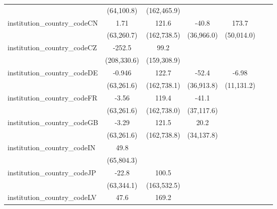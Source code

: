 \begin{tabular}{lcccccc}
                                         & (64,100.8)   & (162,465.9)   &             &               &                &   \\   
   institution\_country\_codeCN          & 1.71         & 121.6         & -40.8       & 173.7         &                &   \\   
                                         & (63,260.7)   & (162,738.5)   & (36,966.0)  & (50,014.0)    &                &   \\   
   institution\_country\_codeCZ          & -252.5       & 99.2          &             &               &                &   \\   
                                         & (208,330.6)  & (159,308.9)   &             &               &                &   \\   
   institution\_country\_codeDE          & -0.946       & 122.7         & -52.4       & -6.98         &                &   \\   
                                         & (63,261.6)   & (162,738.1)   & (36,913.8)  & (11,131.2)    &                &   \\   
   institution\_country\_codeFR          & -3.56        & 119.4         & -41.1       &               &                &   \\   
                                         & (63,261.6)   & (162,738.0)   & (37,117.6)  &               &                &   \\   
   institution\_country\_codeGB          & -3.29        & 121.5         & 20.2        &               &                &   \\   
                                         & (63,261.6)   & (162,738.8)   & (34,137.8)  &               &                &   \\   
   institution\_country\_codeIN          & 49.8         &               &             &               &                &   \\   
                                         & (65,804.3)   &               &             &               &                &   \\   
   institution\_country\_codeJP          & -22.8        & 100.5         &             &               &                &   \\   
                                         & (63,344.1)   & (163,532.5)   &             &               &                &   \\   
   institution\_country\_codeLV          & 47.6         & 169.2         &             &               &                &   \\   

\end{tabular}
